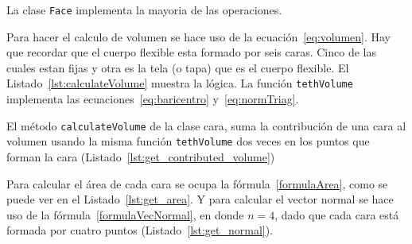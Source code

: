 
La clase \texttt{Face} implementa la mayoria de las operaciones.

Para hacer el calculo de volumen se hace uso de la ecuación~\eqref{eq:volumen}.
Hay que recordar que el cuerpo flexible esta formado por seis caras.
Cinco de las cuales estan fijas y otra es la tela (o tapa) que es el cuerpo flexible.
El Listado~\ref{lst:calculateVolume} muestra la lógica. La función \texttt{tethVolume} implementa las ecuaciones~\eqref{eq:baricentro} y~\eqref{eq:normTriag}.


El método \texttt{calculateVolume} de la clase cara, suma la contribución de una cara al volumen usando la misma función \texttt{tethVolume} dos veces en los puntos que forman la cara (Listado~\ref{lst:get_contributed_volume})


Para calcular el área de cada cara se ocupa la fórmula~\eqref{formulaArea}, como se puede ver en el Listado~\ref{lst:get_area}.
Y para calcular el vector normal se hace uso de la fórmula~\eqref{formulaVecNormal}, en donde $n=4$, dado que cada cara está formada por cuatro puntos (Listado~\ref{lst:get_normal}).



